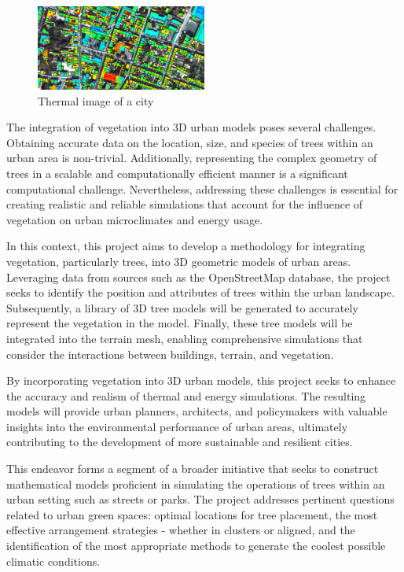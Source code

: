 \documentclass[12pt]{article}
\begin{document}
\begin{figure}[H]
    \centering
    \includegraphics[width=0.5\textwidth]{images/thermographie-aerienne.jpg}
    \caption{Thermal image of a city \cite{img:aerialview}}
\end{figure}

The integration of vegetation into 3D urban models poses several challenges. 
Obtaining accurate data on the location, size, and species of trees within an 
urban area is non-trivial. Additionally, representing the complex geometry of trees 
in a scalable and computationally efficient manner is a significant computational 
challenge. Nevertheless, addressing these challenges is essential for creating 
realistic and reliable simulations that account for the influence of vegetation on 
urban microclimates and energy usage.

In this context, this project aims to develop a methodology for integrating 
vegetation, particularly trees, into 3D geometric models of urban areas. Leveraging 
data from sources such as the OpenStreetMap database, the project seeks to identify 
the position and attributes of trees within the urban landscape. Subsequently, a 
library of 3D tree models will be generated to accurately represent the vegetation 
in the model. Finally, these tree models will be integrated into the terrain mesh, 
enabling comprehensive simulations that consider the interactions between buildings, 
terrain, and vegetation.

By incorporating vegetation into 3D urban models, this project seeks to enhance the 
accuracy and realism of thermal and energy simulations. The resulting models will 
provide urban planners, architects, and policymakers with valuable insights into 
the environmental performance of urban areas, ultimately contributing to the 
development of more sustainable and resilient cities.

This endeavor forms a segment of a broader initiative that seeks to construct
mathematical models proficient in simulating the operations of trees within an
urban setting such as streets or parks. The project addresses pertinent
questions related to urban green spaces: optimal locations for tree placement,
the most effective arrangement strategies - whether in clusters or aligned,
and the identification of the most appropriate methods to generate the coolest
possible climatic conditions.
\end{document}

